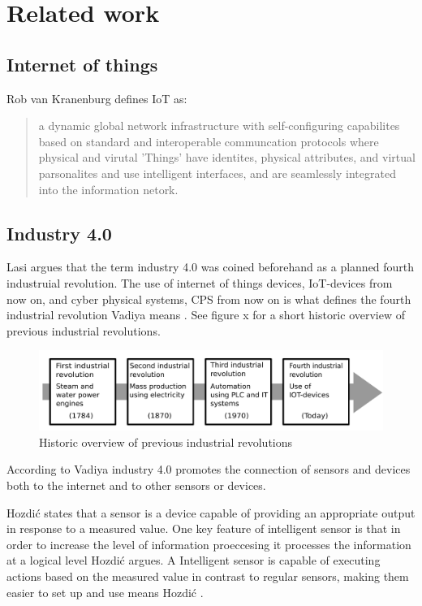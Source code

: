 \section{Related work}
\subsection{Internet of things}
Rob van Kranenburg defines IoT as:
\begin{quote}
    a dynamic global network infrastructure with self-configuring capabilites based on standard and interoperable communcation protocols where physical and virutal 'Things' have identites, physical attributes, and virtual parsonalites and use intelligent interfaces, and are seamlessly integrated into the information netork.  
\end{quote}

\subsection{Industry 4.0}
Lasi \cite{Lasi2014}  argues that the term industry 4.0 was coined beforehand as a planned fourth industruial revolution.
The use of internet of things devices, IoT-devices from now on, and cyber physical systems, CPS from now on is what defines the fourth industrial revolution Vadiya means \cite{Vaidya2018}.
See figure x for a short historic overview of previous industrial revolutions. 
\begin{figure}
    \centering
    \includegraphics[width=\textwidth]{Pictures/Industrial_revolution.pdf} 
    \caption{Historic overview of previous industrial revolutions}
    \label{Indutrial revolutions}
\end{figure}

According to Vadiya \cite{Vaidya2018} industry 4.0 promotes the connection of sensors and devices both to the internet and to other sensors or devices.

Hozdić \cite{Hozdic2015} states that a sensor is a device capable of providing an appropriate output in response to a measured value.
One key feature of intelligent sensor is that in order to increase the level of information proeccesing it processes the information at a logical level Hozdić \cite{Hozdic2015} argues.
A Intelligent sensor  is capable of executing actions based on the measured value in contrast to regular sensors, making them easier to set up and use means Hozdić \cite{Hozdic2015}.

